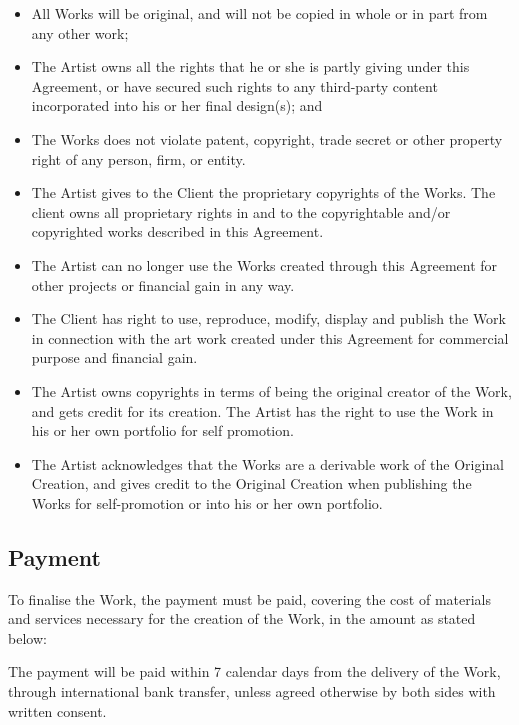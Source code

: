 \documentclass[10pt]{scrartcl}
\begin{document}
\begin{itemize}
\item{All Works will be original, and will not be copied in whole or
    in part from any other work;
  }
\item{The Artist owns all the rights that he or she is partly giving under
    this Agreement, or have secured such rights to any third-party content
    incorporated into his or her final design(s); and
  }
\item{The Works does not violate patent, copyright, trade secret or other
    property right of any person, firm, or entity.
  }
\item{The Artist gives to the Client the proprietary copyrights of the
  Works. The client owns all proprietary rights in and to the copyrightable
  and/or copyrighted works described in this Agreement.
  }
\item{The Artist can no longer use the Works created through this Agreement
    for other projects or financial gain in any way.
  }
\item{The Client has right to use, reproduce, modify, display and publish the
    Work in connection with the art work created under this Agreement for
    commercial purpose and financial gain.
  }
\item{The Artist owns copyrights in terms of being the original creator of the
    Work, and gets credit for its creation. The Artist has the right to use the
    Work in his or her own portfolio for self promotion.
  }
\item{The Artist acknowledges that the Works are a derivable work of the
    Original Creation, and gives credit to the Original Creation when publishing
    the Works for self-promotion or into his or her own portfolio.
  }
\end{itemize}

\subsection{Payment}

To finalise the Work, the payment must be paid, covering the cost of materials
and services necessary for the creation of the Work, in the amount as stated
below:

\begin{mdframed}
\end{mdframed}

The payment will be paid within 7 calendar days from the delivery of the Work, through international bank transfer, unless agreed otherwise by both sides with written consent.
\end{document}
